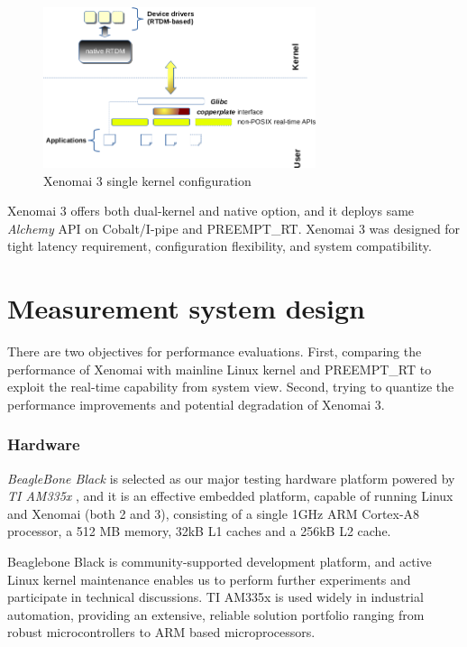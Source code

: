\documentclass[10pt,a4paper]{article}
\begin{document}
\begin{multicols}{2}
\begin{figure}[H]
\begin{center}
\includegraphics[width=8cm]{img/x3-mercury.png}
\caption{Xenomai 3 single kernel configuration}
\label{xenomai3-coblat}
\end{center}
\end{figure}

Xenomai 3 offers both dual-kernel and native option, and it deploys same \textit{Alchemy} \cite{x3-applications} API on Cobalt/I-pipe and PREEMPT\_RT. Xenomai 3 was designed for tight latency requirement, configuration flexibility, and system compatibility.

\section{Measurement system design}
There are two objectives for performance evaluations. First, comparing the performance of Xenomai with mainline Linux kernel and PREEMPT\_RT to exploit the real-time capability from system view. Second, trying to quantize the performance improvements and potential degradation of Xenomai 3.

\subsubsection{Hardware}
\textit{BeagleBone Black}\cite{bbb} is selected as our major testing hardware platform powered by \textit{TI AM335x} \cite{am335x}, and it is an effective embedded platform, capable of running Linux and Xenomai (both 2 and 3), consisting of a single 1GHz ARM Cortex-A8 processor, a 512 MB memory, 32kB L1 caches and a 256kB L2 cache.

Beaglebone Black is community-supported development platform, and active Linux kernel maintenance enables us to perform further experiments and participate in technical discussions. TI AM335x is used widely in industrial automation, providing an extensive, reliable solution portfolio ranging from robust microcontrollers to ARM based microprocessors.


\end{multicols}
\end{document}
